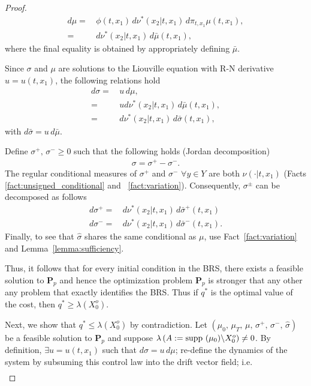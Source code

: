 \documentclass[dvipsnames]{article}
\providecommand{\supp}{\ensuremath \text{supp }}
\begin{document}
\begin{proof}
\begin{align*}
\label{eq:domination:conditional:2}
   d\mu =&\,\phi(t,x_1)\,d\nu^*(x_2|t,x_1)\,d\pi_{t,x_1}\mu(t,x_1),\\\nonumber
    =&\,d\nu^*(x_2|t,x_1)\,d\bar\mu(t,x_1),
\end{align*}
where the final equality is obtained by appropriately defining $\bar\mu$.
\par
Since $\sigma$ and $\mu$ are solutions to the Liouville equation with R-N derivative \mbox{$u=u(t,x_1)$}, the following relations hold
\begin{align*}
  d\sigma=&\,u\,d\mu,\\
  =&\,ud\nu^*(x_2|t,x_1)\,d\bar\mu(t,x_1),\\
  =&\,d\nu^*(x_2|t,x_1)\,d\bar\sigma(t,x_1),
\end{align*}
with $d\bar \sigma=u\,d\bar\mu$.
\par
Define $\sigma^+,\,\sigma^-\ge 0$ such that the following holds (Jordan decomposition)
\begin{align*}
  \sigma=\sigma^+-\sigma^-.
\end{align*}
The regular conditional measures of $\sigma^+$ and $\sigma^-$ $\forall y\in Y$ are both $\nu(\cdot|t,x_1)$ (Facts \ref{fact:unsigned_conditional} and ~\ref{fact:variation}). Consequently, $\sigma^\pm$ can be decomposed as follows
\begin{align*}
  d\sigma^+=&\,d\nu^*(x_2|t,x_1)\,d\bar\sigma^+(t,x_1)\\
  d\sigma^-=&\,d\nu^*(x_2|t,x_1)\,d\bar\sigma^-(t,x_1).
\end{align*}
Finally, to see that $\hat\sigma$ shares the same conditional as $\mu$, use Fact~\ref{fact:variation} and Lemma~\ref{lemma:sufficiency}.
\par
Thus, it follows that for every initial condition in the BRS, there exists a feasible solution to {\bf P$_p$} and hence the optimization problem {\bf P$_p$} is stronger that any other any problem that exactly identifies the BRS. Thus if $q^*$ is the optimal value of the cost, then $q^*\ge \lambda(X_0^o)$.
\par
Next, we show that $q^*\le \lambda(X_0^o)$ by contradiction. Let $(\mu_0,\,\mu_T,\,\mu,\,\sigma^+,\,\sigma^-,\,\hat\sigma)$ be a feasible solution to {\bf P$_p$} and suppose $\lambda\,(A:=\supp(\mu_0)\backslash X_0^o)\ne 0$. By definition, $\exists u=u(t,x_1)$ such that $d\sigma=u\,d\mu$; re-define the dynamics of the system by subsuming this control law into the drift vector field; i.e.
\begin{align*}

\end{align*}
\end{proof}
\end{document}
